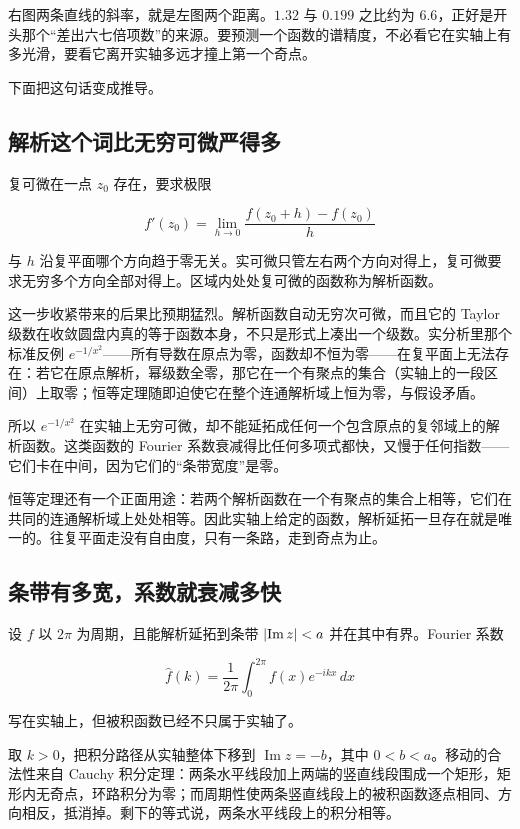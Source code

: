 右图两条直线的斜率，就是左图两个距离。\(1.32\) 与 \(0.199\) 之比约为 \(6.6\)，正好是开头那个``差出六七倍项数''的来源。要预测一个函数的谱精度，不必看它在实轴上有多光滑，要看它离开实轴多远才撞上第一个奇点。

下面把这句话变成推导。

\subsection{解析这个词比无穷可微严得多}

复可微在一点 \(z_0\) 存在，要求极限

\[
f'(z_0)=\lim_{h\to 0}\frac{f(z_0+h)-f(z_0)}{h}
\]

与 \(h\) 沿复平面哪个方向趋于零无关。实可微只管左右两个方向对得上，复可微要求无穷多个方向全部对得上。区域内处处复可微的函数称为解析函数。

这一步收紧带来的后果比预期猛烈。解析函数自动无穷次可微，而且它的 Taylor 级数在收敛圆盘内真的等于函数本身，不只是形式上凑出一个级数。实分析里那个标准反例 \(e^{-1/x^2}\)——所有导数在原点为零，函数却不恒为零——在复平面上无法存在：若它在原点解析，幂级数全零，那它在一个有聚点的集合（实轴上的一段区间）上取零；恒等定理随即迫使它在整个连通解析域上恒为零，与假设矛盾。

所以 \(e^{-1/x^2}\) 在实轴上无穷可微，却不能延拓成任何一个包含原点的复邻域上的解析函数。这类函数的 Fourier 系数衰减得比任何多项式都快，又慢于任何指数——它们卡在中间，因为它们的``条带宽度''是零。

恒等定理还有一个正面用途：若两个解析函数在一个有聚点的集合上相等，它们在共同的连通解析域上处处相等。因此实轴上给定的函数，解析延拓一旦存在就是唯一的。往复平面走没有自由度，只有一条路，走到奇点为止。

\subsection{条带有多宽，系数就衰减多快}

设 \(f\) 以 \(2\pi\) 为周期，且能解析延拓到条带 \(\left|\operatorname{Im}z\right|<a\) 并在其中有界。Fourier 系数

\[
\widehat{f}(k)=\frac1{2\pi}\int_0^{2\pi}f(x)e^{-ikx}\,dx
\]

写在实轴上，但被积函数已经不只属于实轴了。

取 \(k>0\)，把积分路径从实轴整体下移到 \(\operatorname{Im}z=-b\)，其中 \(0<b<a\)。移动的合法性来自 Cauchy 积分定理：两条水平线段加上两端的竖直线段围成一个矩形，矩形内无奇点，环路积分为零；而周期性使两条竖直线段上的被积函数逐点相同、方向相反，抵消掉。剩下的等式说，两条水平线段上的积分相等。

